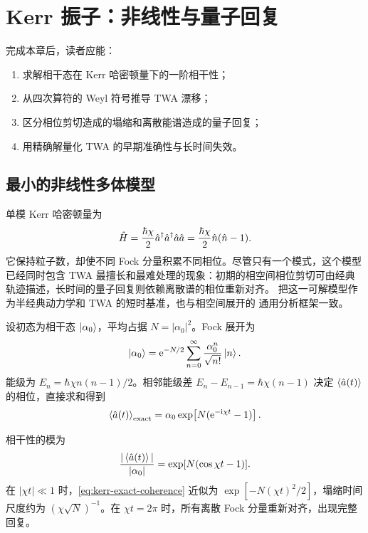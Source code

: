 \chapter{Kerr 振子：非线性与量子回复}
\label{ch:kerr}

\begin{learningobjectives}
完成本章后，读者应能：
\begin{enumerate}
  \item 求解相干态在 Kerr 哈密顿量下的一阶相干性；
  \item 从四次算符的 Weyl 符号推导 TWA 漂移；
  \item 区分相位剪切造成的塌缩和离散能谱造成的量子回复；
  \item 用精确解量化 TWA 的早期准确性与长时间失效。
\end{enumerate}
\end{learningobjectives}

\section{最小的非线性多体模型}

单模 Kerr 哈密顿量为
\begin{equation}
  \hat H=\frac{\hbar\chi}{2}\hat a^{\dagger}\hat a^{\dagger}\hat a\hat a
  =\frac{\hbar\chi}{2}\hat n(\hat n-1).
  \label{eq:kerr-hamiltonian}
\end{equation}
它保持粒子数，却使不同 Fock 分量积累不同相位。尽管只有一个模式，这个模型已经同时包含 TWA 最擅长和最难处理的现象：初期的相空间相位剪切可由经典轨迹描述，长时间的量子回复则依赖离散谱的相位重新对齐。
把这一可解模型作为半经典动力学和 TWA 的短时基准，也与相空间展开的
通用分析框架一致\cite{Polkovnikov2003,Polkovnikov2010}。

设初态为相干态 $\left\lvert \alpha_0\right\rangle$，平均占据 $N=|\alpha_0|^2$。Fock 展开为
\begin{equation}
  \left\lvert \alpha_0\right\rangle=\mathrm{e}^{-N/2}
  \sum_{n=0}^{\infty}\frac{\alpha_0^n}{\sqrt{n!}}\left\lvert n\right\rangle.
\end{equation}
能级为 $E_n=\hbar\chi n(n-1)/2$。相邻能级差 $E_n-E_{n-1}=\hbar\chi(n-1)$ 决定 $\left\langle \hat a(t)\right\rangle$ 的相位，直接求和得到
\begin{equation}
  \left\langle \hat a(t)\right\rangle_{\mathrm{exact}}
  =\alpha_0\exp\!\left[N(\mathrm{e}^{-\mathrm{i}\chi t}-1)\right].
  \label{eq:kerr-exact-mean}
\end{equation}

相干性的模为
\begin{equation}
  \frac{|\left\langle \hat a(t)\right\rangle|}{|\alpha_0|}
  =\exp[N(\cos\chi t-1)].
  \label{eq:kerr-exact-coherence}
\end{equation}
在 $|\chi t|\ll1$ 时，\cref{eq:kerr-exact-coherence} 近似为 $\exp[-N(\chi t)^2/2]$，塌缩时间尺度约为 $(\chi\sqrt N)^{-1}$。在 $\chi t=2\pi$ 时，所有离散 Fock 分量重新对齐，出现完整回复。

